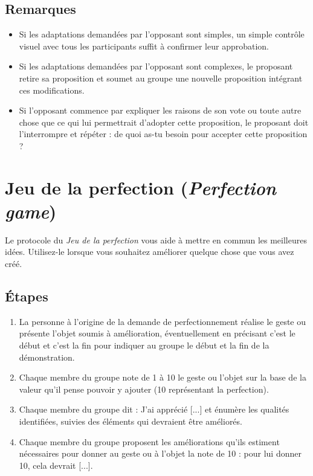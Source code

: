 \documentclass[paper=6in:9in,pagesize=pdftex,headinclude=on,footinclude=on,11pt]{scrbook}
\let\oldsection\section
\renewcommand\section{\clearpage\oldsection}
\begin{document}
\subsection{Remarques}
\begin{itemize}
	\item Si les adaptations demandées par l'opposant sont simples, un simple contrôle visuel avec tous les participants suffit à confirmer leur approbation.
	\item Si les adaptations demandées par l'opposant sont complexes, le proposant retire sa proposition et soumet au groupe une nouvelle proposition intégrant
	      ces modifications.
	\item Si l'opposant commence par expliquer les raisons de son vote ou toute autre chose que ce qui lui permettrait d'adopter cette proposition, le proposant
	      doit l'interrompre et répéter : \og{}de quoi as-tu besoin pour accepter cette proposition ?\fg{}
\end{itemize}

\section{Jeu de la perfection (\emph{Perfection game})} \label{protocole-jeu-perfection}

Le protocole du \emph{Jeu de la perfection} vous aide à mettre en commun les meilleures idées. Utilisez-le lorsque vous souhaitez améliorer quelque chose que vous
avez créé.

\subsection{Étapes}
\begin{enumerate}
	\item La personne à l'origine de la demande de perfectionnement réalise le geste ou présente l'objet soumis à amélioration, éventuellement en
	      précisant \og{}c'est le début\fg{} et \og{}c'est la fin\fg{} pour indiquer au groupe le début et la fin de la démonstration.
	\item Chaque membre du groupe note de 1 à 10 le geste ou l'objet sur la base de la valeur qu'il pense pouvoir y ajouter (10 représentant la perfection).
	\item Chaque membre du groupe dit : \og{}J'ai apprécié [...]\fg{} et énumère les qualités identifiées, suivies des éléments qui devraient être améliorés.
	\item Chaque membre du groupe proposent les améliorations qu'ils estiment nécessaires pour donner au geste ou à l'objet la note de 10 : \og{}pour lui donner
	      10, cela devrait [...]\fg{}.
\end{enumerate}
\end{document}
